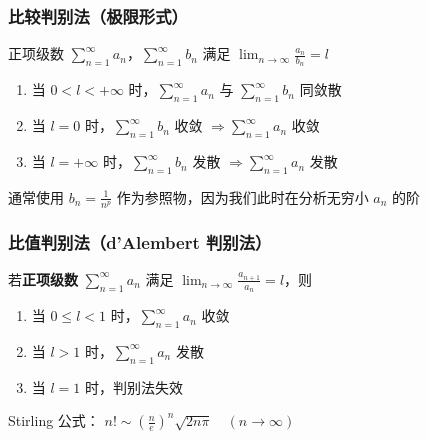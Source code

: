 \documentclass[lang = zh , final , oneside , openany , titlepage , zihao = -4 , linespread = 1.3 , baselineskip = false , cjk-font = windows , text-font = newtx , math-font = newtx , math-style = ISO , uppercase-greek = upright , integral-limits = false]{sjtureport}
\begin{document}
\subsubsection{比较判别法（极限形式）}

\begin{theorem}
    正项级数
\(\displaystyle \sum_{n=1}^\infty a_n\)，\(\displaystyle \sum_{n=1}^\infty b_n\)
满足 \(\displaystyle \lim_{n\to\infty} \frac{a_n}{b_n} = l\)

\begin{enumerate}
\item
  当 \(0 <l<+\infty\) 时，\(\displaystyle \sum_{n=1}^\infty a_n\) 与
  \(\displaystyle \sum_{n=1}^\infty b_n\) 同敛散
\item
  当 \(l=0\) 时，\(\displaystyle \sum_{n=1}^\infty b_n\) 收敛
  \(\Rightarrow \displaystyle \sum_{n=1}^\infty a_n\) 收敛
\item
  当 \(l=+\infty\) 时，\(\displaystyle \sum_{n=1}^\infty b_n\) 发散
  \(\Rightarrow \displaystyle \sum_{n=1}^\infty a_n\) 发散
\end{enumerate}
\end{theorem}

\begin{remark}
    通常使用 \(b_n = \frac{1}{n^p}\) 作为参照物，因为我们此时在分析无穷小
\(a_n\) 的阶
\end{remark}

\subsubsection{比值判别法（d'Alembert 判别法）}

\begin{theorem}
    若\textbf{正项级数} \(\displaystyle \sum_{n=1}^\infty a_n\) 满足
\(\displaystyle \lim_{n\to\infty} \frac{a_{n+1}}{a_n} = l\)，则

\begin{enumerate}
\item
  当 \(0\leq l<1\) 时，\(\displaystyle \sum_{n=1}^\infty a_n\) 收敛
\item
  当 \(l>1\) 时，\(\displaystyle \sum_{n=1}^\infty a_n\) 发散
\item
  当 \(l=1\) 时，判别法失效
\end{enumerate}
\end{theorem}

\begin{remark}
    Stirling 公式：
\(n! \sim \left(\frac{n}{e}\right)^n \sqrt{2n\pi} \quad (n\to\infty)\)
\end{remark}
\end{document}
